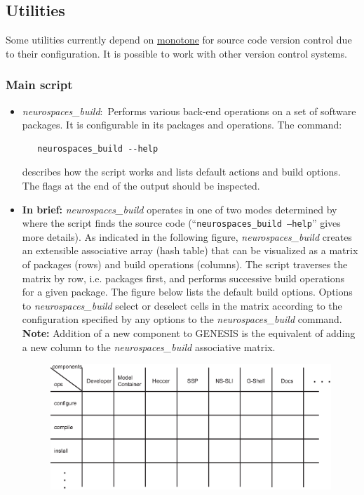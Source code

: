 \documentclass[12pt]{article}
\begin{document}
\subsection*{Utilities}
Some utilities currently depend on \href{http://monotone.ca}{monotone} for source code version control due to their configuration. It is possible to work with other version control systems.

\subsubsection*{Main script}

\begin{itemize}
   \item {\it neurospaces\_build}:\,\,\,Performs various back-end operations on a set of software packages. It is configurable in its packages and operations. The command:
      \begin{verbatim}
   neurospaces_build --help
      \end{verbatim}
describes how the script works and lists default actions and build options. The flags at the end of the output should be inspected.

   \item {\bf In brief:} {\it neurospaces\_build} operates in one of two modes determined by where the script finds the source code (``{\tt neurospaces\_build --help}'' gives more details). As indicated in the following figure, {\it neurospaces\_build} creates an extensible associative array (hash table) that can be visualized as a matrix of packages (rows) and build operations (columns). The script traverses the matrix by row, i.e. packages first, and performs successive build operations for a given package. The figure below  lists the default build options. Options to {\it neurospaces\_build} select or deselect cells in the matrix according to the configuration specified by any options to the {\it neurospaces\_build} command. {\bf Note:} Addition of a new component to GENESIS is the equivalent of adding a new column to the {\it neurospaces\_build} associative matrix.
   
\begin{figure}[h]
   \centering
   \includegraphics[scale=0.7]{figures/build-matrix.eps}
\end{figure}
   

\end{itemize}
\end{document}
